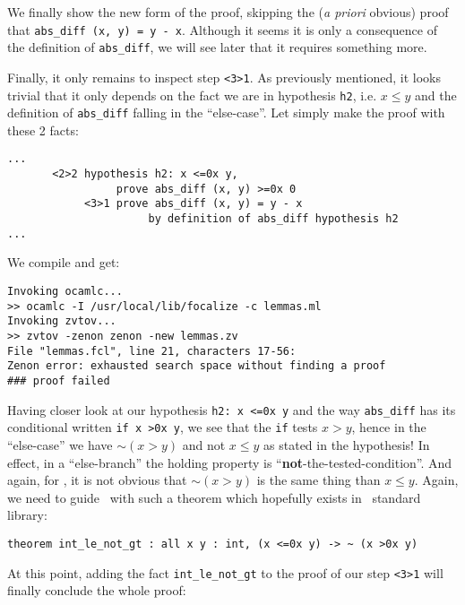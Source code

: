 \documentclass[11pt,a4paper,twoside,onecolumn,fullpage]{article}
\begin{document}
\medskip
We finally show the new form of the proof, skipping the ({\em a priori}
obvious) proof that {\tt abs\_diff (x, y) = y - x}. Although it seems
it is only a consequence of the definition of \lstinline{abs_diff}, we
will see later that it requires something more.

{\scriptsize
}

Finally, it only remains to inspect step \lstinline"<3>1". As
previously mentioned, it looks trivial that it only depends on the
fact we are in hypothesis \lstinline"h2", i.e. $x \le y$ and the
definition of \lstinline"abs_diff" falling in the ``else-case''. Let
simply make the proof with these 2 facts:

{\scriptsize
\begin{lstlisting}
...
       <2>2 hypothesis h2: x <=0x y,
                 prove abs_diff (x, y) >=0x 0
            <3>1 prove abs_diff (x, y) = y - x
                      by definition of abs_diff hypothesis h2
...
\end{lstlisting}}

\noindent We compile and get:

{\scriptsize
\begin{verbatim}
Invoking ocamlc...
>> ocamlc -I /usr/local/lib/focalize -c lemmas.ml
Invoking zvtov...
>> zvtov -zenon zenon -new lemmas.zv
File "lemmas.fcl", line 21, characters 17-56:                
Zenon error: exhausted search space without finding a proof
### proof failed
\end{verbatim}}

Having closer look at our hypothesis \lstinline"h2: x <=0x y" and the
way \lstinline"abs_diff" has its conditional written
\lstinline"if x >0x y", we see that the \lstinline"if" tests $x >y$,
hence in the ``else-case'' we have $\sim (x >y)$ and not $x \le y$ as
stated in the hypothesis! In effect, in a ``else-branch'' the holding
property is ``{\bf not}-the-tested-condition''. And again, for \zenon,
it is not obvious that $\sim (x >y)$ is the same thing than $x \le y$.
Again, we need to guide \zenon\ with such a theorem which hopefully
exists in \focal\ standard library:

{\scriptsize
\begin{lstlisting}
theorem int_le_not_gt : all x y : int, (x <=0x y) -> ~ (x >0x y)
\end{lstlisting}}

At this point, adding the fact \lstinline"int_le_not_gt" to the proof
of our step \lstinline"<3>1" will finally conclude the whole proof:

{\scriptsize
}






\end{document}
